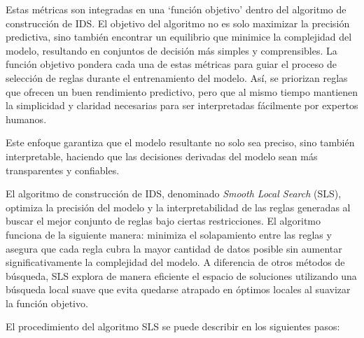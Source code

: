 Estas métricas son integradas en una ‘función objetivo’ dentro del algoritmo de construcción de IDS. El objetivo del algoritmo no es solo maximizar la precisión predictiva, sino también encontrar un equilibrio que minimice la complejidad del modelo, resultando en conjuntos de decisión más simples y comprensibles. La función objetivo pondera cada una de estas métricas para guiar el proceso de selección de reglas durante el entrenamiento del modelo. Así, se priorizan reglas que ofrecen un buen rendimiento predictivo, pero que al mismo tiempo mantienen la simplicidad y claridad necesarias para ser interpretadas fácilmente por expertos humanos.

Este enfoque garantiza que el modelo resultante no solo sea preciso, sino también interpretable, haciendo que las decisiones derivadas del modelo sean más transparentes y confiables.

El algoritmo de construcción de IDS, denominado \textit{Smooth Local Search} (SLS), optimiza la precisión del modelo y la interpretabilidad de las reglas generadas al buscar el mejor conjunto de reglas bajo ciertas restricciones. El algoritmo funciona de la siguiente manera: minimiza el solapamiento entre las reglas y asegura que cada regla cubra la mayor cantidad de datos posible sin aumentar significativamente la complejidad del modelo. A diferencia de otros métodos de búsqueda, SLS explora de manera eficiente el espacio de soluciones utilizando una búsqueda local suave que evita quedarse atrapado en óptimos locales al suavizar la función objetivo.

El procedimiento del algoritmo SLS se puede describir en los siguientes pasos:

